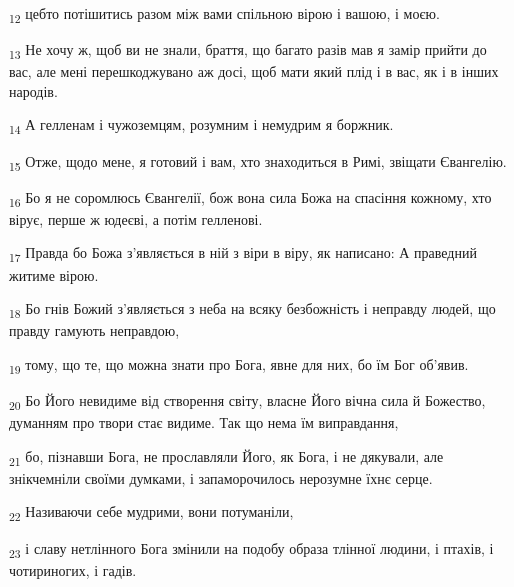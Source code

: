 \begin{tcolorbox}
\textsubscript{12} цебто потішитись разом між вами спільною вірою і вашою, і моєю.
\end{tcolorbox}
\begin{tcolorbox}
\textsubscript{13} Не хочу ж, щоб ви не знали, браття, що багато разів мав я замір прийти до вас, але мені перешкоджувано аж досі, щоб мати який плід і в вас, як і в інших народів.
\end{tcolorbox}
\begin{tcolorbox}
\textsubscript{14} А гелленам і чужоземцям, розумним і немудрим я боржник.
\end{tcolorbox}
\begin{tcolorbox}
\textsubscript{15} Отже, щодо мене, я готовий і вам, хто знаходиться в Римі, звіщати Євангелію.
\end{tcolorbox}
\begin{tcolorbox}
\textsubscript{16} Бо я не соромлюсь Євангелії, бож вона сила Божа на спасіння кожному, хто вірує, перше ж юдеєві, а потім гелленові.
\end{tcolorbox}
\begin{tcolorbox}
\textsubscript{17} Правда бо Божа з'являється в ній з віри в віру, як написано: А праведний житиме вірою.
\end{tcolorbox}
\begin{tcolorbox}
\textsubscript{18} Бо гнів Божий з'являється з неба на всяку безбожність і неправду людей, що правду гамують неправдою,
\end{tcolorbox}
\begin{tcolorbox}
\textsubscript{19} тому, що те, що можна знати про Бога, явне для них, бо їм Бог об'явив.
\end{tcolorbox}
\begin{tcolorbox}
\textsubscript{20} Бо Його невидиме від створення світу, власне Його вічна сила й Божество, думанням про твори стає видиме. Так що нема їм виправдання,
\end{tcolorbox}
\begin{tcolorbox}
\textsubscript{21} бо, пізнавши Бога, не прославляли Його, як Бога, і не дякували, але знікчемніли своїми думками, і запаморочилось нерозумне їхнє серце.
\end{tcolorbox}
\begin{tcolorbox}
\textsubscript{22} Називаючи себе мудрими, вони потуманіли,
\end{tcolorbox}
\begin{tcolorbox}
\textsubscript{23} і славу нетлінного Бога змінили на подобу образа тлінної людини, і птахів, і чотириногих, і гадів.
\end{tcolorbox}
